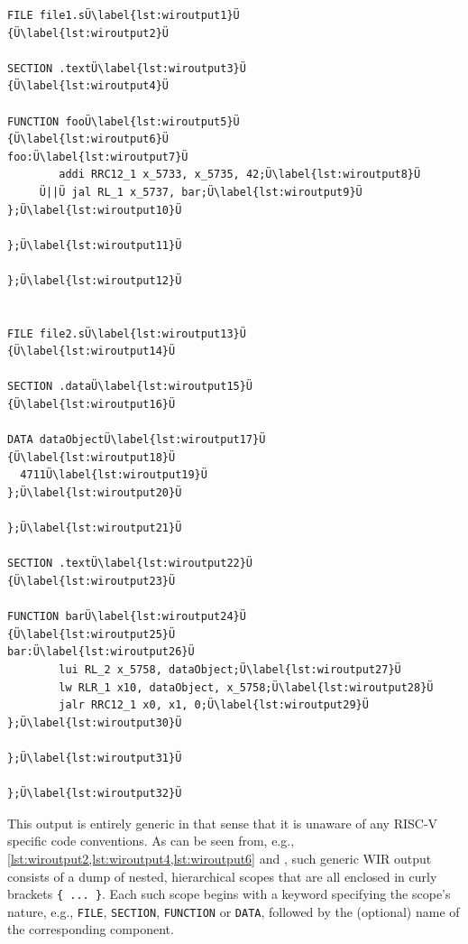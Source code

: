 \begin{lstlisting}[style=commandline,float=h]
FILE file1.sÜ\label{lst:wiroutput1}Ü
{Ü\label{lst:wiroutput2}Ü

SECTION .textÜ\label{lst:wiroutput3}Ü
{Ü\label{lst:wiroutput4}Ü

FUNCTION fooÜ\label{lst:wiroutput5}Ü
{Ü\label{lst:wiroutput6}Ü
foo:Ü\label{lst:wiroutput7}Ü
        addi RRC12_1 x_5733, x_5735, 42;Ü\label{lst:wiroutput8}Ü
     Ü||Ü jal RL_1 x_5737, bar;Ü\label{lst:wiroutput9}Ü
};Ü\label{lst:wiroutput10}Ü

};Ü\label{lst:wiroutput11}Ü

};Ü\label{lst:wiroutput12}Ü


FILE file2.sÜ\label{lst:wiroutput13}Ü
{Ü\label{lst:wiroutput14}Ü

SECTION .dataÜ\label{lst:wiroutput15}Ü
{Ü\label{lst:wiroutput16}Ü

DATA dataObjectÜ\label{lst:wiroutput17}Ü
{Ü\label{lst:wiroutput18}Ü
  4711Ü\label{lst:wiroutput19}Ü
};Ü\label{lst:wiroutput20}Ü

};Ü\label{lst:wiroutput21}Ü

SECTION .textÜ\label{lst:wiroutput22}Ü
{Ü\label{lst:wiroutput23}Ü

FUNCTION barÜ\label{lst:wiroutput24}Ü
{Ü\label{lst:wiroutput25}Ü
bar:Ü\label{lst:wiroutput26}Ü
        lui RL_2 x_5758, dataObject;Ü\label{lst:wiroutput27}Ü
        lw RLR_1 x10, dataObject, x_5758;Ü\label{lst:wiroutput28}Ü
        jalr RRC12_1 x0, x1, 0;Ü\label{lst:wiroutput29}Ü
};Ü\label{lst:wiroutput30}Ü

};Ü\label{lst:wiroutput31}Ü

};Ü\label{lst:wiroutput32}Ü
\end{lstlisting}

This output is entirely generic in that sense that it is unaware of any RISC-V specific code conventions.
As can be seen from, e.g., \cref{lst:wiroutput2,lst:wiroutput4,lst:wiroutput6} and , such generic \gls{WIR} output consists of a dump of nested, hierarchical scopes that are all enclosed in curly brackets \texttt{\{\,...\,\}}.
Each such scope begins with a keyword specifying the scope's nature, e.g., \texttt{FILE}, \texttt{SECTION}, \texttt{FUNCTION} or \texttt{DATA}, followed by the (optional) name of the corresponding component.


